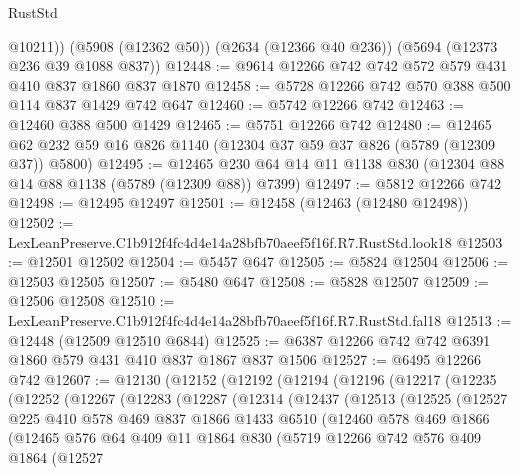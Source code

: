 \begin{lexlean}{RustStd}
\begin{coremodule}
        @10211))
    (@5908 (@12362 @50))
    (@2634 (@12366 @40 @236))
    (@5694 (@12373 @236 @39 @1088 @837))
@12448 := @9614 @12266 @742 @742 @572 @579 @431 @410 @837 @1860 @837 @1870
@12458 := @5728 @12266 @742 @570 @388 @500 @114 @837 @1429 @742 @647
@12460 := @5742 @12266 @742
@12463 := @12460 @388 @500 @1429
@12465 := @5751 @12266 @742
@12480 := @12465 @62 @232 @59 @16 @826 @1140 (@12304 @37 @59 @37 @826 (@5789 (@12309 @37)) @5800)
@12495 := @12465 @230 @64 @14 @11 @1138 @830 (@12304 @88 @14 @88 @1138 (@5789 (@12309 @88)) @7399)
@12497 := @5812 @12266 @742
@12498 := @12495 @12497
@12501 := @12458 (@12463 (@12480 @12498))
@12502 := LexLeanPreserve.C1b912f4fc4d4e14a28bfb70aeef5f16f.R7.RustStd.look18
@12503 := @12501 @12502
@12504 := @5457 @647
@12505 := @5824 @12504
@12506 := @12503 @12505
@12507 := @5480 @647
@12508 := @5828 @12507
@12509 := @12506 @12508
@12510 := LexLeanPreserve.C1b912f4fc4d4e14a28bfb70aeef5f16f.R7.RustStd.fal18
@12513 := @12448 (@12509 @12510 @6844)
@12525 := @6387 @12266 @742 @742 @6391 @1860 @579 @431 @410 @837 @1867 @837 @1506
@12527 := @6495 @12266 @742
@12607 := @12130
    (@12152
      (@12192
        (@12194
          (@12196
            (@12217
              (@12235
                (@12252
                  (@12267
                    (@12283
                      (@12287
                        (@12314
                          (@12437
                            (@12513
                              (@12525
                                (@12527
                                  @225
                                  @410
                                  @578
                                  @469
                                  @837
                                  @1866
                                  @1433
                                  @6510
                                  (@12460
                                    @578
                                    @469
                                    @1866
                                    (@12465
                                      @576
                                      @64
                                      @409
                                      @11
                                      @1864
                                      @830
                                      (@5719
                                        @12266
                                        @742
                                        @576
                                        @409
                                        @1864
                                        (@12527

\end{coremodule}
\end{lexlean}
